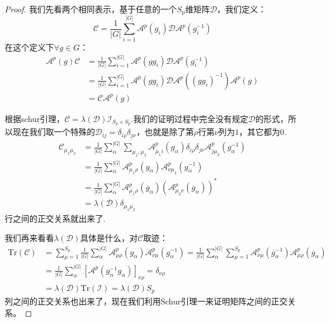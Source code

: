 \begin{proof}
	我们先看两个相同表示，基于任意的一个$S_p$维矩阵$\mathcal{D}$，我们定义：
	\begin{equation*}
		\mathcal{C}=\frac{1}{|G|}\sum_{i=1}^{|G|}\mathcal{A}^p(g_i)\mathcal{D}\mathcal{A}^p(g_i^{-1})
	\end{equation*}
			在这个定义下$\forall g\in G$：
	\begin{align*}
		\mathcal{A}^p(g)\mathcal{C}&=\frac{1}{|G|}\sum_{i=1}^{|G|}\mathcal{A}^p(gg_i)\mathcal{D}\mathcal{A}^p(g_i^{-1})\\
		&=\frac{1}{|G|}\sum_{i=1}^{|G|}\mathcal{A}^p(gg_i)\mathcal{D}\mathcal{A}^p((gg_i)^{-1})\mathcal{A}^p(g)\\
		&=\mathcal{C}\mathcal{A}^p(g)
	\end{align*}
	
	根据schur引理，$\mathcal{C}=\lambda(\mathcal{D})\mathcal{I}_{S_p\times S_p}$.我们的证明过程中完全没有规定$\mathcal{D}$的形式，所以现在我们取一个特殊的$\mathcal{D}_{ij}=\delta_{i\rho}\delta_{j\nu}$，也就是除了第$\rho$行第$\nu$列为$1$，其它都为$0$.
	\begin{align*}
		\mathcal{C}_{\mu_1\mu_2}&=\frac{1}{|G|}\sum_{\alpha}^{|G|}\sum_{\mu_1,\mu_2}\mathcal{A}_{\mu_1i}^p(g_\alpha)\delta_{i\rho}\delta_{j\nu}\mathcal{A}_{j\mu_2}^p(g_\alpha^{-1})\\
		&=\frac{1}{|G|}\sum_{\alpha}^{|G|}\mathcal{A}_{\mu_1\rho}^p(g_\alpha)\mathcal{A}_{\nu\mu_2}^p(g_\alpha^{-1})\\
		&=\frac{1}{|G|}\sum_{\alpha}^{|G|}\mathcal{A}_{\mu_1\rho}^p(g_\alpha)(\mathcal{A}_{\mu_2\nu}^p(g_\alpha))^*\\
		&=\lambda(\mathcal{D})\delta_{\mu_1\mu_2}
	\end{align*}
	行之间的正交关系就出来了.
	
	我们再来看看$\lambda(\mathcal{D})$具体是什么，对$\mathcal{C}$取迹：
	\begin{align*}
		\mathrm{Tr} (\mathcal{C})&=\sum_{\mu=1}^{S_p}\frac{1}{|G|}\sum_{\alpha}^{|G|}\mathcal{A}_{\mu\rho}^p(g_\alpha)\mathcal{A}_{\nu\mu}^p(g_\alpha^{-1})=\frac{1}{|G|}\sum_{\alpha}^{|G|}\sum_{\mu=1}^{S_p}\mathcal{A}_{\nu\mu}^p(g_\alpha^{-1})\mathcal{A}_{\mu\rho}^p(g_\alpha)\\
		&=\frac{1}{|G|}\sum_{\alpha}^{|G|}\left[\mathcal{A}^p(g_\alpha^{-1}g_\alpha)\right]_{\nu\rho}=\delta_{\nu\rho}\\
		&=\lambda(\mathcal{D})\mathrm{Tr} (\mathcal{I})=\lambda(\mathcal{D})S_p
	\end{align*}
	列之间的正交关系也出来了，现在我们利用Schur引理一来证明矩阵之间的正交关系。
	

\end{proof}
